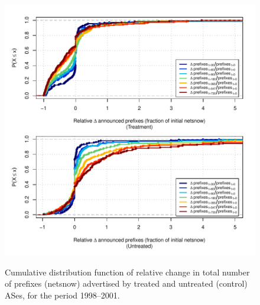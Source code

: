 \begin{figure}[H]
\begin{centering}
\begin{singlespace}
    \includegraphics[width=6in]{figures/behavior-rel_netsnow-1998_2001-corr.pdf}
    \vspace{-2em}\\
    \caption{Cumulative distribution function of relative change in total number of prefixes (netsnow) advertised by treated and untreated (control) ASes, for the period 1998--2001.}
\end{singlespace}
\end{centering}
\end{figure}

